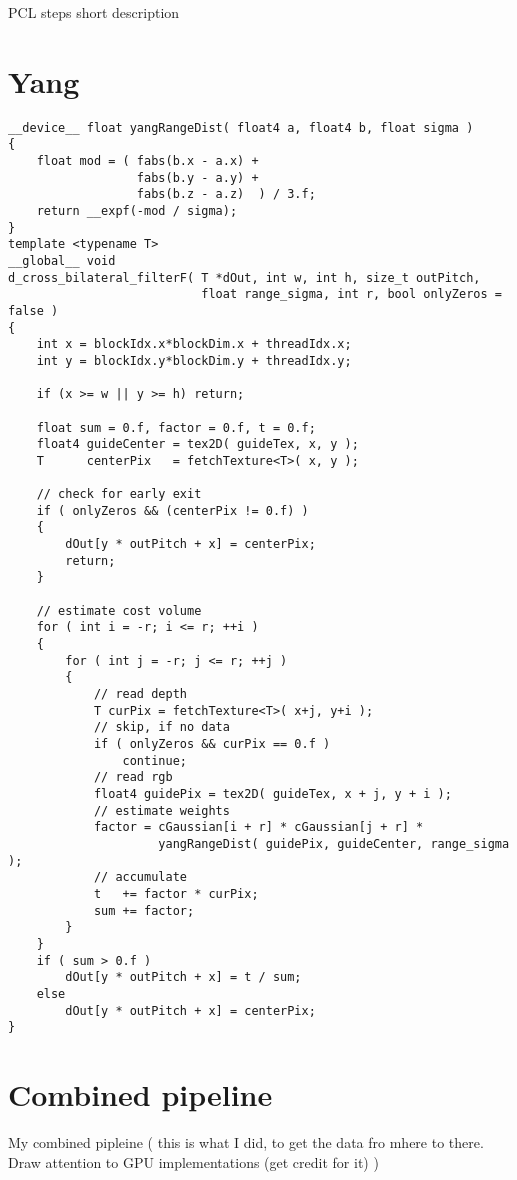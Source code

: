 \documentclass{ucl_thesis}
\begin{document}
PCL steps short description

\section{Yang}

\lstset{style=customcpp}
\begin{lstlisting}
__device__ float yangRangeDist( float4 a, float4 b, float sigma )
{
    float mod = ( fabs(b.x - a.x) +
                  fabs(b.y - a.y) +
                  fabs(b.z - a.z)  ) / 3.f;
    return __expf(-mod / sigma);
}
template <typename T>
__global__ void
d_cross_bilateral_filterF( T *dOut, int w, int h, size_t outPitch,
                           float range_sigma, int r, bool onlyZeros = false )
{
    int x = blockIdx.x*blockDim.x + threadIdx.x;
    int y = blockIdx.y*blockDim.y + threadIdx.y;

    if (x >= w || y >= h) return;

    float sum = 0.f, factor = 0.f, t = 0.f;
    float4 guideCenter = tex2D( guideTex, x, y );
    T      centerPix   = fetchTexture<T>( x, y );

    // check for early exit
    if ( onlyZeros && (centerPix != 0.f) )
    {
        dOut[y * outPitch + x] = centerPix;
        return;
    }

    // estimate cost volume
    for ( int i = -r; i <= r; ++i )
    {
        for ( int j = -r; j <= r; ++j )
        {
            // read depth
            T curPix = fetchTexture<T>( x+j, y+i );
            // skip, if no data
            if ( onlyZeros && curPix == 0.f )
                continue;
            // read rgb
            float4 guidePix = tex2D( guideTex, x + j, y + i );
            // estimate weights
            factor = cGaussian[i + r] * cGaussian[j + r] *
                     yangRangeDist( guidePix, guideCenter, range_sigma );
            // accumulate
            t   += factor * curPix;
            sum += factor;
        }
    }
    if ( sum > 0.f )
        dOut[y * outPitch + x] = t / sum;
    else
        dOut[y * outPitch + x] = centerPix;
}

\end{lstlisting}

\section{Combined pipeline}
My combined pipleine ( this is what I did, to get the data fro mhere to there. Draw attention to GPU implementations (get credit for it) )
\end{document}
